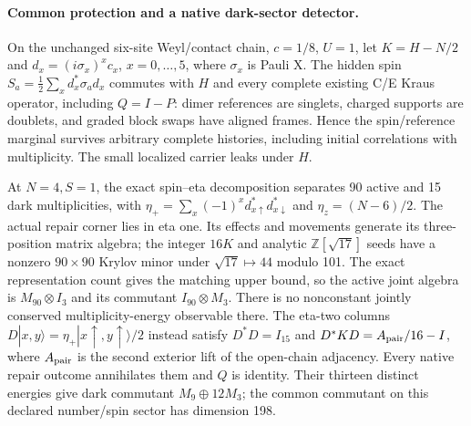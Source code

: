 \paragraph{Common protection and a native dark-sector detector.}
On the unchanged six-site Weyl/contact chain, $c=1/8$, $U=1$, let
$K=H-N/2$ and $d_x=(i\sigma_x)^x c_x$, $x=0,\ldots,5$, where
$\sigma_x$ is Pauli X.  The hidden spin
$S_a=\tfrac12\sum_xd_x^*\sigma_a d_x$ commutes with $H$ and every
complete existing C/E Kraus operator, including $Q=I-P$: dimer
references are singlets, charged supports are doublets, and graded
block swaps have aligned frames.  Hence the spin/reference marginal
survives arbitrary complete histories, including initial correlations
with multiplicity.  The small localized carrier leaks under $H$.

At $N=4,S=1$, the exact spin--eta decomposition separates 90 active
and 15 dark multiplicities, with
$\eta_+=\sum_x(-1)^xd_{x\uparrow}^*d_{x\downarrow}^*$ and
$\eta_z=(N-6)/2$.  The actual repair corner lies in eta one.  Its
effects and movements generate its three-position matrix algebra;
the integer $16K$ and analytic $\mathbb Z[\sqrt{17}]$ seeds have a
nonzero $90\times90$ Krylov minor under $\sqrt{17}\mapsto44$ modulo
101.  The exact representation count gives the matching upper bound,
so the active joint algebra is $M_{90}\otimes I_3$ and its commutant
$I_{90}\otimes M_3$.  There is no nonconstant jointly conserved
multiplicity-energy observable there.  The eta-two columns
$D|x,y\rangle=\eta_+|x\uparrow,y\uparrow\rangle/2$ instead satisfy
$D^*D=I_{15}$ and $D^*KD=A_{\rm pair}/16-I$, where $A_{\rm pair}$
is the second exterior lift of the open-chain adjacency.  Every native
repair outcome annihilates them and $Q$ is identity.  Their thirteen
distinct energies give dark commutant $M_9\oplus12M_3$; the common
commutant on this declared number/spin sector has dimension 198.

